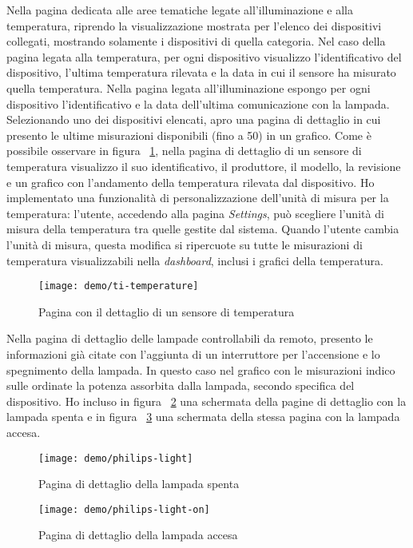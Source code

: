 Nella pagina dedicata alle aree tematiche legate all'illuminazione e alla temperatura, riprendo la visualizzazione mostrata per l'elenco dei dispositivi collegati, mostrando solamente i dispositivi di quella categoria. Nel caso della pagina legata alla temperatura, per ogni dispositivo visualizzo l'identificativo del dispositivo, l'ultima temperatura rilevata e la data in cui il sensore ha misurato quella temperatura. Nella pagina legata all'illuminazione espongo per ogni dispositivo l'identificativo e la data dell'ultima comunicazione con la lampada.
Selezionando uno dei dispositivi elencati, apro una pagina di dettaglio in cui presento le ultime misurazioni disponibili (fino a 50) in un grafico.
Come è possibile osservare in figura ~\ref{fig:temp}, nella pagina di dettaglio di un sensore di temperatura visualizzo il suo identificativo, il produttore, il modello, la revisione e un grafico con l'andamento della temperatura rilevata dal dispositivo.
Ho implementato una funzionalità di personalizzazione dell'unità di misura per la temperatura: l'utente, accedendo alla pagina \emph{Settings}, può scegliere l'unità di misura della temperatura tra quelle gestite dal sistema. Quando l'utente cambia l'unità di misura, questa modifica si ripercuote su tutte le misurazioni di temperatura visualizzabili nella \emph{dashboard}, inclusi i grafici della temperatura.

\begin{figure}[!h]
    \centering
    \texttt{[image: demo/ti-temperature]}
    \caption{Pagina con il dettaglio di un sensore di temperatura}
    \label{fig:temp}
\end{figure}

Nella pagina di dettaglio delle lampade controllabili da remoto, presento le informazioni già citate con l'aggiunta di un interruttore per l'accensione e lo spegnimento della lampada. In questo caso nel grafico con le misurazioni indico sulle ordinate la potenza assorbita dalla lampada, secondo specifica del dispositivo. Ho incluso in figura ~\ref{fig:light} una schermata della pagine di dettaglio con la lampada spenta e in figura ~\ref{fig:light-on} una schermata della stessa pagina con la lampada accesa.

\begin{figure}[H]
    \centering
    \texttt{[image: demo/philips-light]}
    \caption{Pagina di dettaglio della lampada spenta}
    \label{fig:light}
\end{figure}

\begin{figure}[H]
    \centering
    \texttt{[image: demo/philips-light-on]}
    \caption{Pagina di dettaglio della lampada accesa}
    \label{fig:light-on}
\end{figure}


